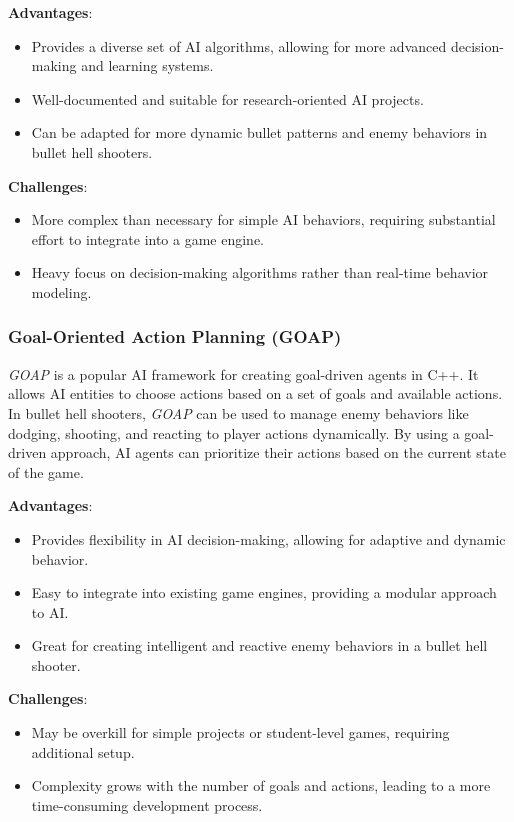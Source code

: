 \documentclass{article} %
\begin{document}
\textbf{Advantages}:
\begin{itemize}
	\item Provides a diverse set of AI algorithms, allowing for more advanced decision-making and learning systems.
	\item Well-documented and suitable for research-oriented AI projects.
	\item Can be adapted for more dynamic bullet patterns and enemy behaviors in bullet hell shooters.
\end{itemize}

\textbf{Challenges}:
\begin{itemize}
	\item More complex than necessary for simple AI behaviors, requiring substantial effort to integrate into a game engine.
	\item Heavy focus on decision-making algorithms rather than real-time behavior modeling.
\end{itemize}

\subsubsection{Goal-Oriented Action Planning (GOAP)}

\textit{GOAP} is a popular AI framework for creating goal-driven agents in C++. It allows AI entities to choose actions based on a set of goals and available actions. In bullet hell shooters, \textit{GOAP} can be used to manage enemy behaviors like dodging, shooting, and reacting to player actions dynamically. By using a goal-driven approach, AI agents can prioritize their actions based on the current state of the game.

\textbf{Advantages}:
\begin{itemize}
	\item Provides flexibility in AI decision-making, allowing for adaptive and dynamic behavior.
	\item Easy to integrate into existing game engines, providing a modular approach to AI.
	\item Great for creating intelligent and reactive enemy behaviors in a bullet hell shooter.
\end{itemize}

\textbf{Challenges}:
\begin{itemize}
	\item May be overkill for simple projects or student-level games, requiring additional setup.
	\item Complexity grows with the number of goals and actions, leading to a more time-consuming development process.
\end{itemize}
\end{document}

